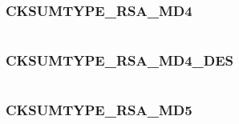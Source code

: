 \documentclass[letterpaper,10pt,english]{sphinxmanual}
\begin{document}
\subsubsection{CKSUMTYPE\_RSA\_MD4}
\label{appdev/refs/macros/CKSUMTYPE_RSA_MD4::doc}\label{appdev/refs/macros/CKSUMTYPE_RSA_MD4:cksumtype-rsa-md4}\label{appdev/refs/macros/CKSUMTYPE_RSA_MD4:cksumtype-rsa-md4-data}

\begin{fulllineitems}
\label{appdev/refs/macros/CKSUMTYPE_RSA_MD4:CKSUMTYPE_RSA_MD4}
\end{fulllineitems}


\begin{tabulary}{\linewidth}{|L|L|}
\hline

 & 
\\\hline
\end{tabulary}



\subsubsection{CKSUMTYPE\_RSA\_MD4\_DES}
\label{appdev/refs/macros/CKSUMTYPE_RSA_MD4_DES::doc}\label{appdev/refs/macros/CKSUMTYPE_RSA_MD4_DES:cksumtype-rsa-md4-des}\label{appdev/refs/macros/CKSUMTYPE_RSA_MD4_DES:cksumtype-rsa-md4-des-data}

\begin{fulllineitems}
\label{appdev/refs/macros/CKSUMTYPE_RSA_MD4_DES:CKSUMTYPE_RSA_MD4_DES}
\end{fulllineitems}


\begin{tabulary}{\linewidth}{|L|L|}
\hline

 & 
\\\hline
\end{tabulary}



\subsubsection{CKSUMTYPE\_RSA\_MD5}
\label{appdev/refs/macros/CKSUMTYPE_RSA_MD5:cksumtype-rsa-md5-data}\label{appdev/refs/macros/CKSUMTYPE_RSA_MD5::doc}\label{appdev/refs/macros/CKSUMTYPE_RSA_MD5:cksumtype-rsa-md5}
\end{document}
